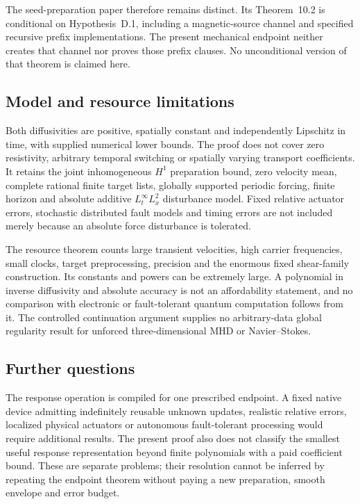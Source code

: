 \documentclass[11pt,a4paper]{amsart}
\theoremstyle{definition}
\theoremstyle{remark}
\numberwithin{equation}{section}
\begin{document}
The seed-preparation paper \cite{Seed} therefore remains distinct. Its
Theorem~10.2 is conditional on Hypothesis~D.1, including a magnetic-source
channel and specified recursive prefix implementations. The present
mechanical endpoint neither creates that channel nor proves those prefix
clauses. No unconditional version of that theorem is claimed here.

\subsection{Model and resource limitations}
Both diffusivities are positive, spatially constant and independently
Lipschitz in time, with supplied numerical lower bounds. The proof does not
cover zero resistivity, arbitrary temporal switching or spatially varying
transport coefficients. It retains the joint inhomogeneous $H^1$ preparation
bound, zero velocity mean, complete rational finite target lists, globally
supported periodic forcing, finite horizon and absolute additive
$L^\infty_tL^2_x$ disturbance model. Fixed relative actuator errors, stochastic
distributed fault models and timing errors are not included merely because
an absolute force disturbance is tolerated.

The resource theorem counts large transient velocities, high carrier
frequencies, small clocks, target preprocessing, precision and the enormous
fixed shear-family construction. Its constants and powers can be extremely
large. A polynomial in inverse diffusivity and
absolute accuracy is not an affordability statement, and no comparison with
electronic or fault-tolerant quantum computation follows from it. The
controlled continuation argument supplies no arbitrary-data global
regularity result for unforced three-dimensional MHD or Navier--Stokes.

\subsection{Further questions}
The response operation is compiled for one prescribed endpoint. A fixed
native device admitting indefinitely reusable unknown updates, realistic
relative errors, localized physical actuators or autonomous fault-tolerant
processing would require additional results. The present proof also does
not classify the smallest useful response representation beyond finite
polynomials with a paid coefficient bound. These are separate problems;
their resolution cannot be inferred by repeating the endpoint theorem
without paying a new preparation, smooth envelope and error budget.
\end{document}
